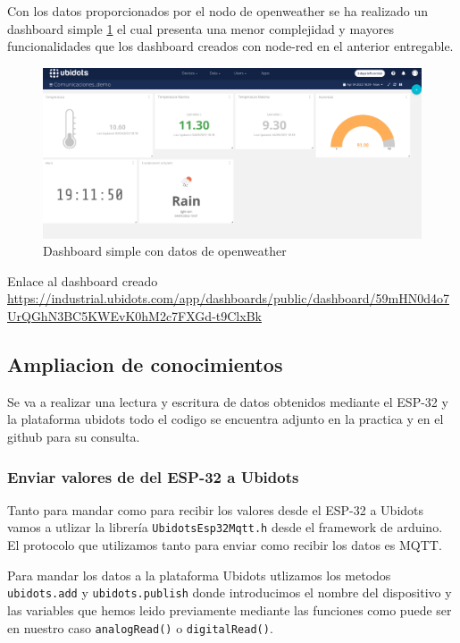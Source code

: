 \documentclass[11pt, letterpaper]{article}
\begin{document}
Con los datos proporcionados por el nodo de openweather se ha realizado un dashboard simple \ref{fig:dashboard_ejemplo}
el cual presenta una menor complejidad y mayores funcionalidades que los dashboard creados con node-red
en el anterior entregable.

\pagebreak
\begin{figure}[h]
	\centering
	\includegraphics[width=\textwidth]{dashboard_ejemplo.png}
	\caption{Dashboard simple con datos de openweather}
	\label{fig:dashboard_ejemplo}
\end{figure}

Enlace al dashboard creado \url{https://industrial.ubidots.com/app/dashboards/public/dashboard/59mHN0d4o7UrQGhN3BC5KWEvK0hM2c7FXGd-t9ClxBk}

\subsection{Ampliacion de conocimientos}
Se va a realizar una lectura y escritura de datos obtenidos mediante el ESP-32 y la plataforma
ubidots todo el codigo se encuentra adjunto en la practica y en el github para su consulta.
\subsubsection{Enviar valores de del ESP-32 a Ubidots}
Tanto para mandar como para recibir los valores desde el ESP-32 a Ubidots vamos a
utlizar la librería \texttt{UbidotsEsp32Mqtt.h} desde el framework de arduino. El protocolo que utilizamos tanto 
para enviar como recibir los datos es MQTT.


Para mandar los datos a la plataforma Ubidots utlizamos los metodos \texttt{ubidots.add} y \texttt{ubidots.publish}
donde introducimos el nombre del dispositivo y las variables que hemos leido previamente mediante las funciones como puede ser en
nuestro caso \texttt{analogRead()} o \texttt{digitalRead()}.\\
\end{document}
